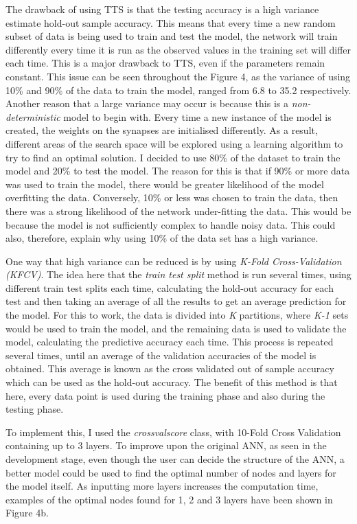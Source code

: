 \documentclass[11pt]{article}
\begin{document}
The drawback of using TTS is that the testing accuracy is a high variance estimate hold-out sample accuracy. This means that every time a new random subset  of data is being used to train and test the model,  the network will train differently every time it is run as the observed values in the training set will differ each time. This is a major drawback to TTS, even if the parameters remain constant. 
This issue can be seen throughout the Figure 4, as the variance of using 10\% and  90\% of the data to train the model, ranged from 6.8 to 35.2 respectively.  Another reason that a large variance may occur is because this is a \textit{non-deterministic} model to begin with. Every time a new instance of the model is created, the weights on the synapses are initialised differently. As a result, different areas of the search space will be explored using a learning algorithm to try to find an optimal solution. 
I decided to use 80\% of the dataset to train the model and 20\% to test the model. The reason for this is that if 90\% or more data was used to train the model, there would be greater likelihood of the model overfitting the data. Conversely, 10\% or less was chosen to train the data, then there was a strong likelihood of the network under-fitting the data. This would be because the model is not sufficiently complex to handle noisy data. This could also, therefore, explain why using 10\% of the data set has a high variance. 

One way that high variance can be reduced is by using \textit{K-Fold Cross-Validation (KFCV)}. The idea here that the \textit{train test split} method is run several times, using different train test splits each time, calculating the hold-out accuracy for each test and then taking an average of all the results to get an average prediction for the model. For this to work, the data is divided into \textit{K} partitions, where \textit{K-1} sets would be used to train the model, and the remaining data is used to validate the model, calculating the predictive accuracy each time. This process is repeated several times, until an average of the validation accuracies of the model is obtained. This average is known as the cross validated out of sample accuracy which can be used as the hold-out accuracy.  The benefit of this method is that here, every data point is used during the training phase and also during the testing phase.

To implement this, I used the \textit{cross\textunderscore val\textunderscore score} class, with 10-Fold Cross Validation containing up to 3 layers. To improve upon the original ANN, as seen in the development stage, even though the user can decide the structure of the ANN, a better model could be used to find the optimal number of nodes and layers for the model itself. As inputting more layers increases the computation time, examples of the optimal nodes found for 1, 2 and 3 layers have been shown in Figure 4b. 
\end{document}
